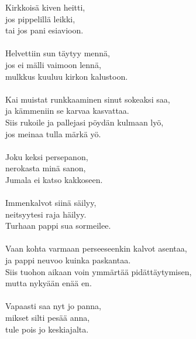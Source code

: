 
            Kirkkoisä kiven heitti,  \\
            jos pippelillä leikki, \\
            tai jos pani esiavioon. \\
\hspace{10mm} \\
            Helvettiin sun täytyy mennä,  \\
            jos ei mälli vaimoon lennä,  \\
            mulkkus kuuluu kirkon kalustoon. \\
\hspace{10mm} \\
            Kai muistat runkkaaminen sinut sokeaksi saa, \\
            ja kämmeniin se karvaa kasvattaa. \\
            Siis rukoile ja pallejasi pöydän kulmaan lyö,  \\
            jos meinaa tulla märkä yö. \\
\hspace{10mm} \\
            Joku keksi persepanon,  \\
            nerokasta minä sanon,  \\
            Jumala ei katso kakkoseen. \\
\hspace{10mm} \\
            Immenkalvot siinä säilyy,  \\
            neitsyytesi raja häilyy. \\
            Turhaan pappi sua sormeilee. \\
\hspace{10mm} \\
            Vaan kohta varmaan perseeseenkin kalvot asentaa,  \\
            ja pappi neuvoo kuinka paskantaa. \\
            Siis tuohon aikaan voin ymmärtää pidättäytymisen,  \\
            mutta nykyään enää en. \\
\hspace{10mm} \\
            Vapaasti saa nyt jo panna,  \\
            mikset silti pesää anna,  \\
            tule pois jo keskiajalta. \\
